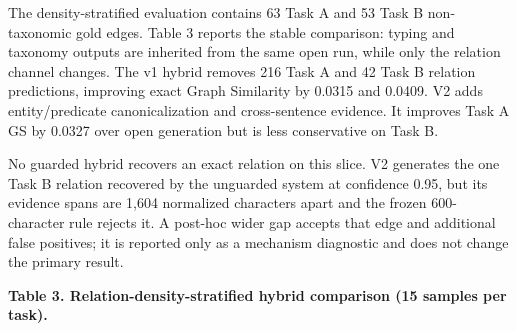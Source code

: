 \documentclass[
]{article}
\begin{document}
The density-stratified evaluation contains 63 Task A and 53 Task B
non-taxonomic gold edges. Table 3 reports the stable comparison: typing
and taxonomy outputs are inherited from the same open run, while only
the relation channel changes. The v1 hybrid removes 216 Task A and 42
Task B relation predictions, improving exact Graph Similarity by 0.0315
and 0.0409. V2 adds entity/predicate canonicalization and cross-sentence
evidence. It improves Task A GS by 0.0327 over open generation but is
less conservative on Task B.

No guarded hybrid recovers an exact relation on this slice. V2 generates
the one Task B relation recovered by the unguarded system at confidence
0.95, but its evidence spans are 1,604 normalized characters apart and
the frozen 600-character rule rejects it. A post-hoc wider gap accepts
that edge and additional false positives; it is reported only as a
mechanism diagnostic and does not change the primary result.

\textbf{Table 3. Relation-density-stratified hybrid comparison (15
samples per task).}
\end{document}
